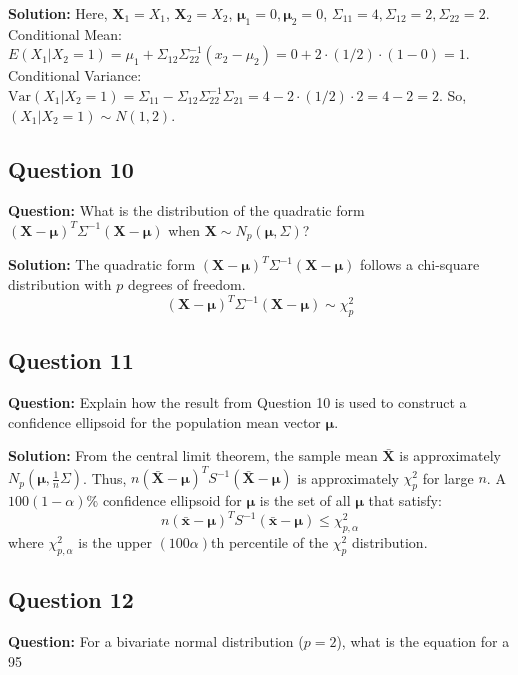 \textbf{Solution:}
Here, $\mathbf{X}_1=X_1$, $\mathbf{X}_2=X_2$, $\boldsymbol{\mu}_1=0, \boldsymbol{\mu}_2=0$, $\Sigma_{11}=4, \Sigma_{12}=2, \Sigma_{22}=2$.
Conditional Mean: $E(X_1 | X_2=1) = \mu_1 + \Sigma_{12}\Sigma_{22}^{-1}(x_2 - \mu_2) = 0 + 2 \cdot (1/2) \cdot (1-0) = 1$.
Conditional Variance: $\text{Var}(X_1 | X_2=1) = \Sigma_{11} - \Sigma_{12}\Sigma_{22}^{-1}\Sigma_{21} = 4 - 2 \cdot (1/2) \cdot 2 = 4 - 2 = 2$.
So, $(X_1 | X_2=1) \sim N(1, 2)$.

\subsection*{Question 10}
\textbf{Question:} What is the distribution of the quadratic form $(\mathbf{X} - \boldsymbol{\mu})^T \Sigma^{-1} (\mathbf{X} - \boldsymbol{\mu})$ when $\mathbf{X} \sim N_p(\boldsymbol{\mu}, \Sigma)$?

\textbf{Solution:}
The quadratic form $(\mathbf{X} - \boldsymbol{\mu})^T \Sigma^{-1} (\mathbf{X} - \boldsymbol{\mu})$ follows a chi-square distribution with $p$ degrees of freedom.
$$ (\mathbf{X} - \boldsymbol{\mu})^T \Sigma^{-1} (\mathbf{X} - \boldsymbol{\mu}) \sim \chi^2_p $$

\subsection*{Question 11}
\textbf{Question:} Explain how the result from Question 10 is used to construct a confidence ellipsoid for the population mean vector $\boldsymbol{\mu}$.

\textbf{Solution:}
From the central limit theorem, the sample mean $\bar{\mathbf{X}}$ is approximately $N_p(\boldsymbol{\mu}, \frac{1}{n}\Sigma)$.
Thus, $n(\bar{\mathbf{X}} - \boldsymbol{\mu})^T S^{-1} (\bar{\mathbf{X}} - \boldsymbol{\mu})$ is approximately $\chi^2_p$ for large $n$.
A $100(1-\alpha)\%$ confidence ellipsoid for $\boldsymbol{\mu}$ is the set of all $\boldsymbol{\mu}$ that satisfy:
$$ n(\bar{\mathbf{x}} - \boldsymbol{\mu})^T S^{-1} (\bar{\mathbf{x}} - \boldsymbol{\mu}) \le \chi^2_{p, \alpha} $$
where $\chi^2_{p, \alpha}$ is the upper $(100\alpha)$th percentile of the $\chi^2_p$ distribution.

\subsection*{Question 12}
\textbf{Question:} For a bivariate normal distribution ($p=2$), what is the equation for a 95%

